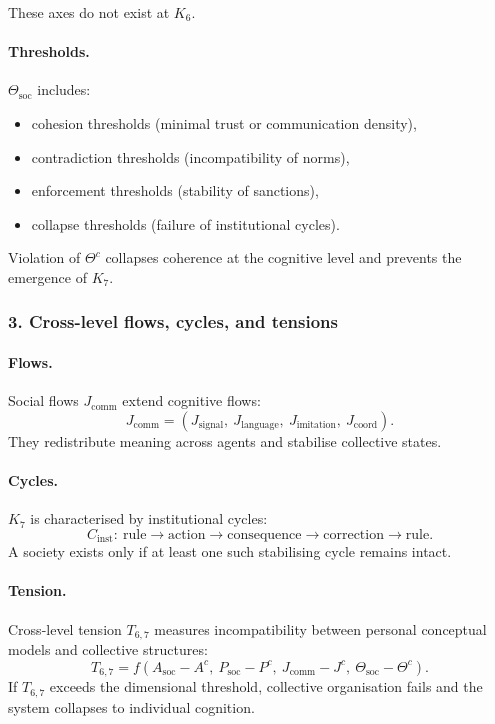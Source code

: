 These axes do not exist at $K_6$.

\paragraph{Thresholds.}
$\Theta_{\mathrm{soc}}$ includes:
\begin{itemize}
  \item cohesion thresholds (minimal trust or communication density),
  \item contradiction thresholds (incompatibility of norms),
  \item enforcement thresholds (stability of sanctions),
  \item collapse thresholds (failure of institutional cycles).
\end{itemize}

Violation of $\Theta^{c}$ collapses coherence at the cognitive level and
prevents the emergence of $K_7$.

\subsubsection{3. Cross-level flows, cycles, and tensions}

\paragraph{Flows.}
Social flows $J_{\mathrm{comm}}$ extend cognitive flows:
\[
J_{\mathrm{comm}} = (J_{\mathrm{signal}},\ J_{\mathrm{language}},\
                     J_{\mathrm{imitation}},\ J_{\mathrm{coord}}).
\]
They redistribute meaning across agents and stabilise collective states.

\paragraph{Cycles.}
$K_7$ is characterised by institutional cycles:
\[
C_{\mathrm{inst}}:\ \text{rule} \rightarrow \text{action}
\rightarrow \text{consequence} \rightarrow \text{correction}
\rightarrow \text{rule}.
\]
A society exists only if at least one such stabilising cycle remains intact.

\paragraph{Tension.}
Cross-level tension $T_{6,7}$ measures incompatibility between personal
conceptual models and collective structures:
\[
T_{6,7} = f(A_{\mathrm{soc}} - A^{c},\ P_{\mathrm{soc}} - P^{c},\
          J_{\mathrm{comm}} - J^{c},\ \Theta_{\mathrm{soc}} - \Theta^{c}).
\]
If $T_{6,7}$ exceeds the dimensional threshold, collective organisation
fails and the system collapses to individual cognition.

